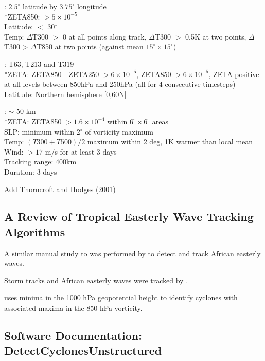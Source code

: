 \documentclass[gmdd, hvmath, online]{copernicus_discussions}
\begin{document}
\cite{mcdonald2005tropical}:  $2.5^\circ$ latitude by $3.75^\circ$ longitude \\
*ZETA850:  $> 5 \times 10^{-5}$ \\
Latitude: $<$ 30$^\circ$ \\
Temp:  $\Delta$T300 $>$ 0 at all points along track, $\Delta$T300 $>$ 0.5K at two points, $\Delta$T300 > $\Delta$T850 at two points (against mean $15^\circ \times 15^\circ$)

\cite{bengtsson2007how}:  T63, T213 and T319 \\
*ZETA:  ZETA850 - ZETA250 $> 6 \times 10^{-5}$, ZETA850 $> 6 \times 10^{-5}$, ZETA positive at all levels between 850hPa and 250hPa (all for 4 consecutive timesteps)
Latitude:  Northern hemisphere [0,60N]

\cite{zhao2009simulations}:  $\sim$ 50 km \\
*ZETA:  ZETA850 $> 1.6 \times 10^{-4}$ within $6^\circ \times 6^\circ$ areas \\
SLP:  minimum within 2$^\circ$ of vorticity maximum \\
Temp:  $(T300 + T500)/2$ maximum within 2 deg, 1K warmer than local mean \\
Wind:  $> 17$ m/s for at least 3 days \\
Tracking range:  400km \\
Duration:  3 days

{\color{red}Add Thorncroft and Hodges (2001)}

\subsection{A Review of Tropical Easterly Wave Tracking Algorithms} \label{sec:TropicalEasterlyWaveAlgorithms}

A similar manual study to \cite{akyildiz1985systematic} was performed by \cite{reed1988evaluation} to detect and track African easterly waves.

Storm tracks and African easterly waves were tracked by \cite{hodges2003comparison}.

\cite{konig1993objective} uses minima in the 1000 hPa geopotential height to identify cyclones with associated maxima in the 850 hPa vorticity.


\subsection{Software Documentation: DetectCyclonesUnstructured} \label{sec:DetectCyclonesUnstructuredAppendix}
\end{document}
